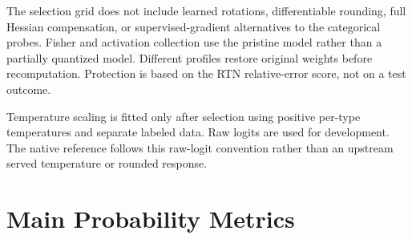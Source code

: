 \documentclass[10pt,twocolumn]{article}
\begin{document}
The selection grid does not include learned rotations, differentiable
rounding, full Hessian compensation, or supervised-gradient alternatives
to the categorical probes. Fisher and activation collection use the
pristine model rather than a partially quantized model. Different
profiles restore original weights before recomputation. Protection
is based on the RTN relative-error score, not on a test outcome.

Temperature scaling is fitted only after selection using positive
per-type temperatures and separate labeled data. Raw logits are used
for development. The native reference follows this raw-logit
convention rather than an upstream served temperature or rounded response.

\section{Main Probability Metrics}
\label{app:probability}
\end{document}
